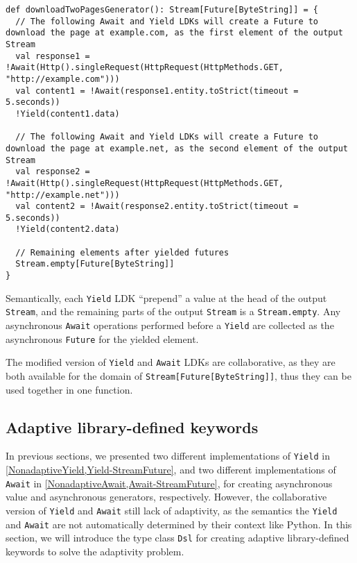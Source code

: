 \begin{lstlisting}[caption={Downloading two web pages as an asynchronous generator, in the style of !-notation},label={downloadTwoPages-StreamFuture}]
def downloadTwoPagesGenerator(): Stream[Future[ByteString]] = {
  // The following Await and Yield LDKs will create a Future to download the page at example.com, as the first element of the output Stream
  val response1 = !Await(Http().singleRequest(HttpRequest(HttpMethods.GET, "http://example.com")))
  val content1 = !Await(response1.entity.toStrict(timeout = 5.seconds))
  !Yield(content1.data)

  // The following Await and Yield LDKs will create a Future to download the page at example.net, as the second element of the output Stream
  val response2 = !Await(Http().singleRequest(HttpRequest(HttpMethods.GET, "http://example.net")))
  val content2 = !Await(response2.entity.toStrict(timeout = 5.seconds))
  !Yield(content2.data)

  // Remaining elements after yielded futures
  Stream.empty[Future[ByteString]]
}
\end{lstlisting}

Semantically, each \lstinline{Yield} LDK ``prepend'' a value at the head of the output \lstinline{Stream}, and the remaining parts of the output \lstinline{Stream} is a \lstinline{Stream.empty}. Any asynchronous \lstinline{Await} operations performed before a \lstinline{Yield} are collected as the asynchronous \lstinline{Future} for the yielded element.

The modified version of \lstinline{Yield} and \lstinline{Await} LDKs are collaborative, as they are both available for the domain of \lstinline{Stream[Future[ByteString]]}, thus they can be used together in one function.

\subsection{Adaptive library-defined keywords}\label{Adaptive library-defined keywords}

In previous sections, we presented two different implementations of \lstinline{Yield} in \cref{NonadaptiveYield,Yield-StreamFuture}, and two different implementations of \lstinline{Await} in \cref{NonadaptiveAwait,Await-StreamFuture}, for creating asynchronous value and asynchronous generators, respectively. However, the collaborative version of \lstinline{Yield} and \lstinline{Await} still lack of adaptivity, as the semantics the \lstinline{Yield} and \lstinline{Await} are not automatically determined by their context like Python. In this section, we will introduce the type class \lstinline{Dsl} for creating adaptive library-defined keywords to solve the adaptivity problem.


